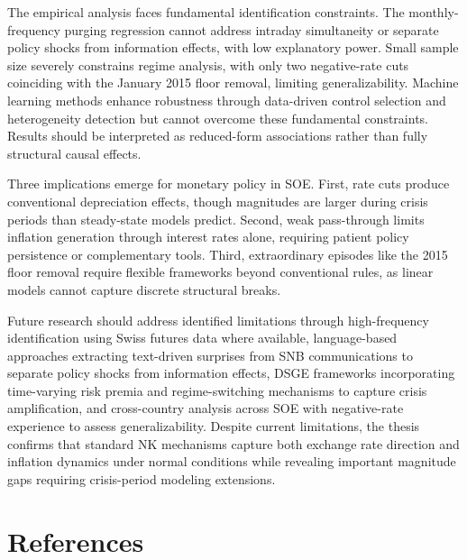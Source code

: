 \documentclass[12pt,a4paper]{article}
\begin{document}
The empirical analysis faces fundamental identification constraints. The monthly-frequency purging regression cannot address intraday simultaneity or separate policy shocks from information effects, with low explanatory power. Small sample size severely constrains regime analysis, with only two negative-rate cuts coinciding with the January 2015 floor removal, limiting generalizability. Machine learning methods enhance robustness through data-driven control selection and heterogeneity detection but cannot overcome these fundamental constraints. Results should be interpreted as reduced-form associations rather than fully structural causal effects.

Three implications emerge for monetary policy in SOE. First, rate cuts produce conventional depreciation effects, though magnitudes are larger during crisis periods than steady-state models predict. Second, weak pass-through limits inflation generation through interest rates alone, requiring patient policy persistence or complementary tools. Third, extraordinary episodes like the 2015 floor removal require flexible frameworks beyond conventional rules, as linear models cannot capture discrete structural breaks.

Future research should address identified limitations through high-frequency identification using Swiss futures data where available, language-based approaches extracting text-driven surprises from SNB communications to separate policy shocks from information effects, DSGE frameworks incorporating time-varying risk premia and regime-switching mechanisms to capture crisis amplification, and cross-country analysis across SOE with negative-rate experience to assess generalizability. Despite current limitations, the thesis confirms that standard NK mechanisms capture both exchange rate direction and inflation dynamics under normal conditions while revealing important magnitude gaps requiring crisis-period modeling extensions.

\newpage
\section*{References}
\begingroup
\renewcommand{\section}[2]{}

\endgroup
\end{document}
